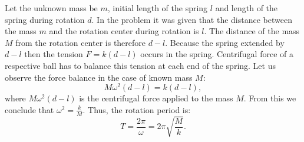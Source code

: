 {\ifEngSolution
Let the unknown mass be $m$, initial length of the spring $l$ and length of the spring during rotation $d$. In the problem it was given that the distance between the mass $m$ and the rotation center during rotation is $l$. The distance of the mass $M$ from the rotation center is therefore $d-l$. Because the spring extended by $d-l$ then the tension $F=k(d-l)$ occurs in the spring. Centrifugal force of a respective ball has to balance this tension at each end of the spring. Let us observe the force balance in the case of known mass $M$:
\begin{equation*}
M\omega^2(d-l)=k(d-l),
\end{equation*} 
where $M\omega^2(d-l)$ is the centrifugal force applied to the mass $M$. From this we conclude that $\omega^2=\frac{k}{M}$. Thus, the rotation period is:
\begin{equation*}
T=\frac{2\pi}{\omega}=2\pi \sqrt{\frac{M}{k}}.
\end{equation*}
\fi
}